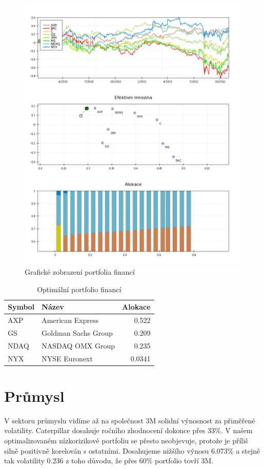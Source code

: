 \documentclass[a4paper,12pt]{report}
\begin{document}
    \begin{figure}[htb]
      \centering
        \includegraphics[height=0.95\textheight]{fin1.png}
       \caption{Grafické zobrazení portfolia financí}
    \end{figure}

    \begin{table}[htb]
      \centering
      \begin{tabular}{|l|l|r|}
        \hline
        Symbol&Název&Alokace\\\hline\hline
        AXP&American Express &0.522\\\hline
        GS&Goldman Sachs Group &0.209\\\hline
        NDAQ&NASDAQ OMX Group &0.235\\\hline
        NYX&NYSE Euronext &0.0341\\\hline
      \end{tabular}
      \caption{Optimální portfolio financí}
    \end{table}
    
  \clearpage
  \section{Průmysl}
    V sektoru průmyslu vidíme až na společnost 3M solidní výnosnost za přiměřené volatility. Caterpillar dosahuje ročního zhodnocení dokonce přes 33\%. V našem optimalizovaném nízkorizikové portfoliu se přesto neobjevuje, protože je příliš silně pozitivně korelován s ostatními. Dosahujeme nižšího výnosu 6.073\% a stejně tak volatility 0.236 z toho důvodu, že přes 60\%  portfolio tovří 3M.
    
\end{document}
